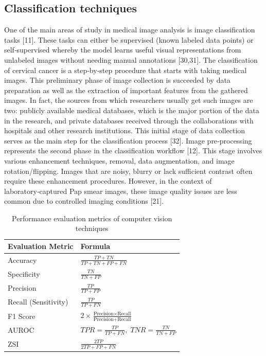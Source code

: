 \documentclass[final,5p,times,twocolumn,authoryear]{elsarticle}
\begin{document}
\subsection{Classification techniques}
One of the main areas of study in medical image analysis is image classification tasks [11]. These tasks can either be supervised (known labeled data points) or self‑supervised whereby the model learns useful visual representations from unlabeled images without needing manual annotations [30,31]. The classification of cervical cancer is a step‑by‑step procedure that starts with taking medical images. This preliminary phase of image collection is succeeded by data preparation as well as the extraction of important features from the gathered images. In fact, the sources from which researchers usually get such images are two: publicly available medical databases, which is the major portion of the data in the research, and private databases received through the collaborations with hospitals and other research institutions. This initial stage of data collection serves as the main step for the classification process [32].
Image pre‑processing represents the second phase in the classification workflow [12]. This stage involves various enhancement techniques, removal, data augmentation, and image rotation/flipping. Images that are noisy, blurry or lack sufficient contrast often require these enhancement procedures. However, in the context of laboratory‑captured Pap smear images, these image quality issues are less common due to controlled imaging conditions [21].
\begin{table}
\centering
\caption{Performance evaluation metrics of computer vision techniques}
\label{tab:performance-metrics}
\begin{tabular}{ll}
\hline
Evaluation Metric & Formula \\
\hline
Accuracy & $\frac{TP + TN}{TP + TN + FP + FN}$ \\
Specificity & $\frac{TN}{TN + FP}$ \\
Precision & $\frac{TP}{TP + FP}$ \\
Recall (Sensitivity) & $\frac{TP}{TP + FN}$ \\
F1 Score & $2 \times \frac{\text{Precision} \times \text{Recall}}{\text{Precision} + \text{Recall}}$ \\
AUROC & $TPR = \frac{TP}{TP + FN},\; TNR = \frac{TN}{TN + FP}$ \\
ZSI & $\frac{2TP}{2TP + FP + FN}$ \\
\hline
\end{tabular}
\end{table}
\end{document}
